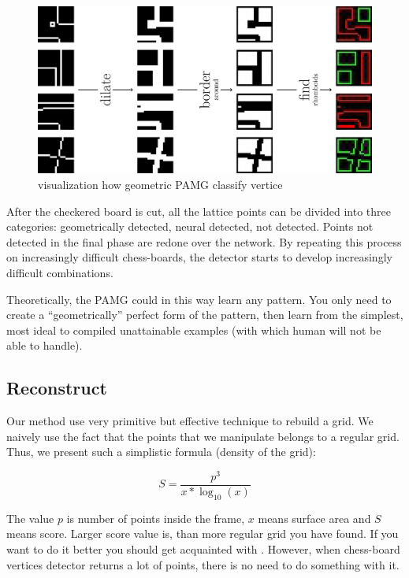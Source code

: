 \documentclass[letterpaper, 12pt]{article}
\begin{document}
\begin{figure}[H]
\centering
\includegraphics[width=\columnwidth]{figure7}
\caption{visualization how geometric PAMG classify vertice}
\end{figure}

After the checkered board is cut, all the lattice points can be divided into three categories: geometrically detected, neural detected, not detected.
Points not detected in the final phase are redone over the network. By repeating
this process on increasingly difficult chess-boards, the detector starts to
develop increasingly difficult combinations.

Theoretically, the PAMG could in this way learn any pattern.
You only need to create a ``geometrically'' perfect form of the pattern, then learn
from the simplest, most ideal to compiled unattainable examples (with which
human will not be able to handle).

\subsection{Reconstruct}

Our method use very primitive but effective technique to rebuild a grid.
We naively use the fact that the points that we manipulate belongs to a
regular grid. Thus, we present such a simplistic formula (density of the grid):

\[S = \dfrac{p^3}{x*\log_{10}{(x)}}\]

The value $p$ is number of points inside the frame, $x$ means surface area and $S$ means score. Larger score value is, than more regular grid you have found.
If you want to do it better you should get acquainted with
\cite{tian2011rectification}. However, when chess-board vertices detector returns
a lot of points, there is no need to do something with it.
\end{document}
